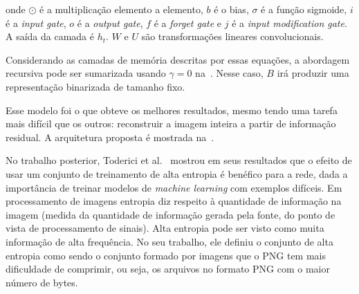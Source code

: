 \noindent onde $\odot$ é a multiplicação elemento a elemento, $b$ é o bias, $\sigma$ é a função sigmoide, $i$ é a \textit{input gate}, $o$ é a \textit{output gate}, $f$ é a \textit{forget gate} e $j$ é a \textit{input modification gate}. A saída da camada é $h_t$. $W$ e $U$ são transformações lineares convolucionais.

Considerando as camadas de memória descritas por essas equações, a abordagem recursiva pode ser sumarizada usando $\gamma = 0$ na~. Nesse caso, $B$ irá produzir uma representação binarizada de tamanho fixo. 

Esse modelo foi o que obteve os melhores resultados, mesmo tendo uma tarefa mais difícil que os outros: reconstruir a imagem inteira a partir de informação residual. A arquitetura proposta é mostrada na~.


No trabalho posterior, Toderici et al.~\cite{toderici2017} mostrou em seus resultados que o efeito de usar um conjunto de treinamento de alta entropia é benéfico para a rede, dada a importância de treinar modelos de \textit{machine learning} com exemplos difíceis. Em processamento de imagens entropia diz respeito à quantidade de informação na imagem (medida da quantidade de informação gerada pela fonte, do ponto de vista de processamento de sinais). Alta entropia pode ser visto como muita informação de alta frequência. No seu trabalho, ele definiu o conjunto de alta entropia como sendo o conjunto formado por imagens que o \acrshort{PNG} tem mais dificuldade de comprimir, ou seja, os arquivos no formato \acrshort{PNG} com o maior número de bytes. 
